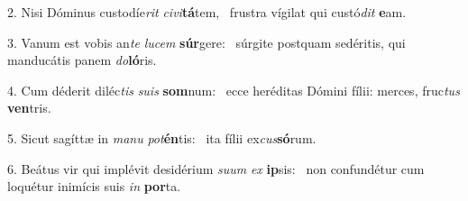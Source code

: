 2. Nisi Dóminus custodíe\textit{rit} \textit{ci}\textit{vi}\textbf{tá}tem, \ast\  frustra vígilat qui custó\textit{dit} \textbf{e}am.\

3. Vanum est vobis an\textit{te} \textit{lu}\textit{cem} \textbf{súr}gere: \ast\  súrgite postquam sedéritis, qui manducátis panem \textit{do}\textbf{ló}ris.\

4. Cum déderit diléc\textit{tis} \textit{su}\textit{is} \textbf{som}num: \ast\  ecce heréditas Dómini fílii: merces, fruc\textit{tus} \textbf{ven}tris.\

5. Sicut sagíttæ in \textit{ma}\textit{nu} \textit{pot}\textbf{én}tis: \ast\  ita fílii ex\textit{cus}\textbf{só}rum.\

6. Beátus vir qui implévit desidérium \textit{su}\textit{um} \textit{ex} \textbf{ip}sis: \ast\  non confundétur cum loquétur inimícis suis \textit{in} \textbf{por}ta.\

